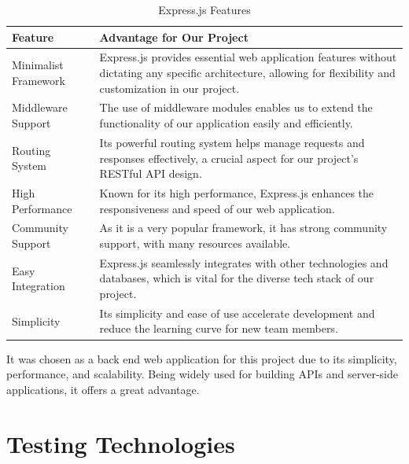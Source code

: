 \begin{table}[H]
    \centering
    \begin{tabularx}{\textwidth}{|l|X|}
        \hline
        \textbf{Feature}     & \textbf{Advantage for Our Project}                                                                                                                              \\
        \hline
        Minimalist Framework & Express.js provides essential web application features without dictating any specific architecture, allowing for flexibility and customization in our project.  \\
        \hline
        Middleware Support   & The use of middleware modules enables us to extend the functionality of our application easily and efficiently.                                                 \\
        \hline
        Routing System       & Its powerful routing system helps manage requests and responses effectively, a crucial aspect for our project's RESTful API design.                             \\
        \hline
        High Performance     & Known for its high performance, Express.js enhances the responsiveness and speed of our web application.                                                        \\
        \hline
        Community Support    & As it is a very popular framework, it has strong community support, with many resources available.\\
        \hline
        Easy Integration     & Express.js seamlessly integrates with other technologies and databases, which is vital for the diverse tech stack of our project.                               \\
        \hline
        Simplicity           & Its simplicity and ease of use accelerate development and reduce the learning curve for new team members.                                                       \\
        \hline
    \end{tabularx}
    \label{tab:expressJS}
    \caption{Express.js Features}
\end{table}

It was chosen as a back end web application for this project due to its simplicity, performance, and scalability. Being widely used for building APIs and server-side applications, it offers a great
advantage.


\section{Testing Technologies}

